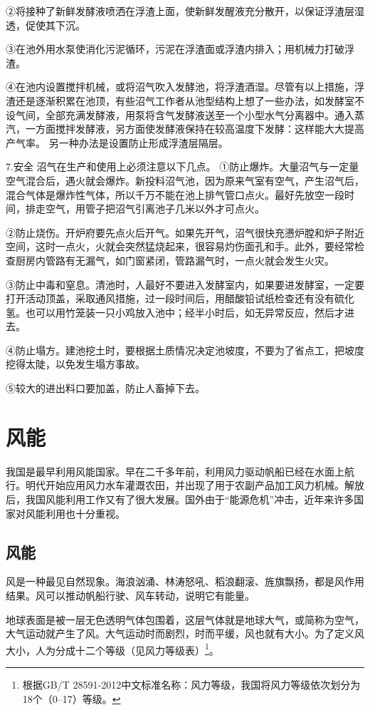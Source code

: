 \documentclass{ctexbook}
\begin{document}
②将接种了新鲜发酵液喷洒在浮渣上面，使新鲜发醒液充分散开，以保证浮渣层湿透，促使其下沉。

③在池外用水泵使消化污泥循环，污泥在浮渣面或浮渣内排入；用机械力打破浮渣。

④在池内设置搅拌机械，或将沼气吹入发酵池，将浮渣酒湿。尽管有以上措施，浮渣还是逐渐积累在池顶，有些沼气工作者从池型结构上想了一些办法，如发酵室不设气间，全部充满发酵液，用泵将含气发酵液送至一个小型水气分离器中。通入蒸汽，一方面搅拌发酵液，另方面使发酵液保持在较高温度下发酵：这样能大大提高产气率。
另一种办法是设置防止形成浮渣层隔层。

7.安全
沼气在生产和使用上必须注意以下几点。
①防止爆炸。大量沼气与一定量空气混合后，遇火就会爆炸。新投料沼气池，因为原来气室有空气，产生沼气后，混合气体是爆炸性气体，所以千万不能在池上排气管口点火。最好先放空一段时间，排走空气，用管子把沼气引离池子几米以外才可点火。

②防止烧伤。开炉府要先点火后开气。如果先开气，沼气很快充懑炉膛和炉子附近空间，这时一点火，火就会突然猛烧起来，很容易灼伤面孔和手。此外，要经常检查厨房内管路有无漏气，如门窗紧闭，管路漏气时，一点火就会发生火灾。

③防止中毒和窒息。清池时，人最好不要进入发酵室内，如果要进发酵室，一定要打开活动顶盖，采取通风措施，过一段时间后，用醋酸铅试纸检查还有没有硫化氢。也可以用竹笼装一只小鸡放入池中；经半小时后，如无异常反应，然后才进去。

④防止塌方。建池挖土时，要根据土质情况决定池坡度，不要为了省点工，把坡度挖得太陡，以免发生塌方事故。

⑤较大的进出料口要加盖，防止人畜掉下去。

\section{风能}
我国是最早利用风能国家。早在二千多年前，利用风力驱动帆船已经在水面上航行。明代开始应用风力水车灌溉农田，并出现了用于农副产品加工风力机械。解放后，我国风能利用工作又有了很大发展。国外由于“能源危机”冲击，近年来许多国家对风能利用也十分重视。
\subsection{风能}
风是一种最见自然现象。海浪汹涌、林涛怒吼、稻浪翻滚、旌旗飘扬，都是风作用结果。风可以推动帆船行驶、风车转动，说明它有能量。

地球表面是被一层无色透明气体包围着，这层气体就是地球大气，或简称为空气，大气运动就产生了风。大气运动时而剧烈，时而平缓，风也就有大小。为了定义风大小，人为分成十二个等级（见风力等级表）\footnote{根据GB/T 28591-2012中文标准名称：风力等级，我国将风力等级依次划分为18个（0--17）等级。}。
\end{document}
